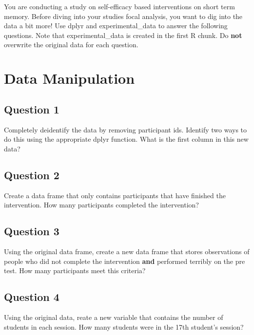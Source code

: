 \documentclass[]{book}
\theoremstyle{definition}
\theoremstyle{definition}
\theoremstyle{definition}
\theoremstyle{remark}
\begin{document}
You are conducting a study on self-efficacy based interventions on short term memory. Before diving into your studies focal analysis, you want to dig into the data a bit more! Use dplyr and experimental\_data to answer the following questions. Note that experimental\_data is created in the first R chunk. Do \textbf{not} overwrite the original data for each question.

\hypertarget{data-manipulation}{%
\section{Data Manipulation}\label{data-manipulation}}

\hypertarget{question-1}{%
\subsection{Question 1}\label{question-1}}

Completely deidentify the data by removing participant ids. Identify two ways to do this using the appropriate dplyr function. What is the first column in this new data?

\hypertarget{question-2}{%
\subsection{Question 2}\label{question-2}}

Create a data frame that only contains participants that have finished the intervention. How many participants completed the intervention?

\hypertarget{question-3}{%
\subsection{Question 3}\label{question-3}}

Using the original data frame, create a new data frame that stores observations of people who did not complete the intervention \textbf{and} performed terribly on the pre test. How many participants meet this criteria?

\hypertarget{question-4}{%
\subsection{Question 4}\label{question-4}}

Using the original data, reate a new variable that contains the number of students in each session. How many students were in the 17th student's session?
\end{document}
